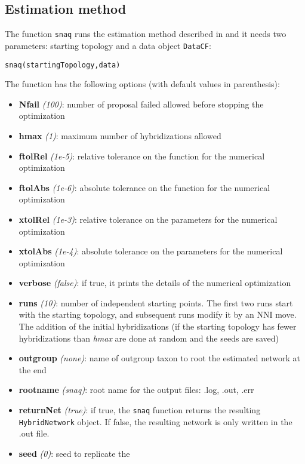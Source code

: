 \documentclass[12pt]{article}
\begin{document}
\subsection{Estimation method}
The function \texttt{snaq} runs the estimation method described in
\citep{Solis-Lemus2015} and it needs two parameters: starting
topology and a data object \texttt{DataCF}:
\begin{lstlisting}
snaq(startingTopology,data)
\end{lstlisting}
The function has the following options (with default values in parenthesis):
\begin{itemize}
\item \textbf{Nfail} \textit{(100)}: number of proposal failed allowed before
  stopping the optimization
\item \textbf{hmax} \textit{(1)}: maximum number of hybridizations
  allowed
\item \textbf{ftolRel} \textit{(1e-5)}: relative tolerance on the function for the numerical
optimization
\item \textbf{ftolAbs} \textit{(1e-6)}: absolute tolerance on the function for the numerical optimization
\item \textbf{xtolRel} \textit{(1e-3)}: relative tolerance on the parameters for the numerical optimization
\item \textbf{xtolAbs} \textit{(1e-4)}: absolute tolerance on the parameters for the numerical optimization
\item \textbf{verbose} \textit{(false)}: if true, it prints the details of the numerical optimization
\item \textbf{runs} \textit{(10)}: number of independent starting points. The
  first two runs start with the starting topology, and subsequent runs
  modify it by an NNI move. The addition of the initial hybridizations
  (if the starting topology has fewer hybridizations than
  \textit{hmax} are done at random and the seeds are saved)
\item \textbf{outgroup} \textit{(none)}: name of outgroup taxon to root the estimated
network at the end
\item \textbf{rootname} \textit{(snaq)}: root name for the output files: .log, .out, .err
\item \textbf{returnNet} \textit{(true)}: if true, the \texttt{snaq} function
  returns the resulting \texttt{HybridNetwork} object. If false, the
  resulting network is only written in the .out file.
\item \textbf{seed} \textit{(0)}: seed to replicate the

\end{itemize}
\end{document}
